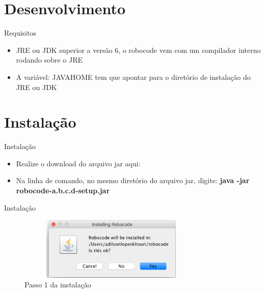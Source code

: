 \section{Desenvolvimento}

\begin{frame}
	\begin{block}{Requisitos}
		\begin{itemize}
			\item JRE ou JDK superior a versão 6, o robocode vem com um compilador interno rodando sobre o JRE

			\item A variável: JAVA\textunderscore HOME tem que apontar para o diretório de instalação do JRE ou JDK
			
		\end{itemize}
	\end{block}
\end{frame}



\section{Instalação}

\begin{frame}
	\begin{block}{Instalação}
		\begin{itemize}
			\item Realize o download do arquivo jar aqui: \href{https://sourceforge.net/projects/robocode/files/robocode/1.9.3.4/}{\color{blue}{Source Forge}} 
			
			\item Na linha de comando, no  mesmo diretório do arquivo jar, digite: \textbf{java -jar robocode-a.b.c.d-setup.jar}
						
		\end{itemize}
	\end{block}
\end{frame}


\begin{frame}
	\begin{block}{Instalação}
		 \begin{figure}[!htb]
			\centering	  				
			\includegraphics[height=3cm, width = 9cm]{./pic/instalacao01.png}
			\caption{Passo 1 da instalação}
			\label{fig_instalacao01}
		\end{figure}
	\end{block}
\end{frame}


